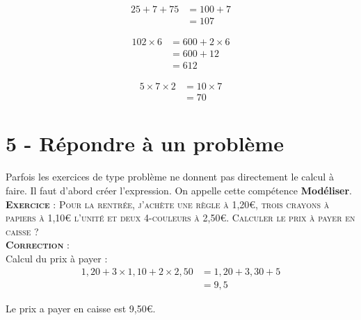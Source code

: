 \documentclass[11pt]{article}
\begin{document}
\begin{minipage}[t]{0.33\textwidth}
\begin{align*}
25 + 7 + 75 &= 100 + 7  \\
            &= 107
\end{align*}

\end{minipage}
\begin{minipage}[t]{0.33\textwidth}

\begin{align*}
102 \times 6 &= 600 + 2 \times 6 \\
             &= 600 + 12 \\
             &= 612
\end{align*}

\end{minipage}
\begin{minipage}[t]{0.33\textwidth}

\begin{align*}
5 \times 7 \times 2 &= 10 \times 7 \\
                    &= 70
\end{align*}
\end{minipage}

\newpage

\section*{5 - Répondre à un problème}

Parfois les exercices de type problème ne donnent pas directement le calcul à faire. Il faut d'abord créer l'expression. On appelle cette compétence \textbf{Modéliser}.\\

\textsc{\textbf{Exercice} : Pour la rentrée, j'achète une règle à 1,20€, trois crayons à papiers à 1,10€ l'unité et deux 4-couleurs à 2,50€.} \newline
\textsc{Calculer le prix à payer en caisse ?}\\

\textsc{\textbf{Correction} :}\\

Calcul du prix à payer :
\begin{align*}
1,20 + 3 \times 1,10 + 2 \times 2,50 &= 1,20 + 3,30 + 5 \\
                                     &= 9,5
\end{align*}

Le prix a payer en caisse est 9,50€.
\end{document}
